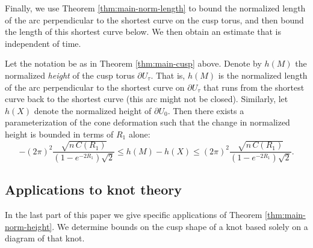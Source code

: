 Finally, we use Theorem \ref{thm:main-norm-length} to bound the
normalized length of the arc perpendicular to the shortest curve on
the cusp torus, and then bound the length of this shortest curve
below.  We then obtain an estimate that is independent of time.

\begin{theorem}
  Let the notation be as in Theorem \ref{thm:main-cusp} above.  Denote
  by $h(M)$ the normalized \emph{height} of the cusp torus $\partial
  U_\tau$.  That is, $h(M)$ is the normalized length of the arc
  perpendicular to the shortest curve on $\partial U_\tau$ that runs
  from the shortest curve back to the shortest curve (this arc might
  not be closed).  Similarly, let $h(X)$ denote the normalized height
  of $\partial U_0$.  Then
	there exists a parameterization of the cone deformation such that
	the change in normalized height is bounded in terms of $R_1$ alone:
$$-(2\pi)^2\frac{\sqrt{n\,C(R_1)}}{(1-e^{-2R_1})\sqrt{2}} \leq
 h(M) - h(X) \leq
(2\pi)^2\frac{\sqrt{n\,C(R_1)}}{(1-e^{-2R_1})\sqrt{2}}.$$
\label{thm:main-norm-height}
\end{theorem}




\subsection{Applications to knot theory}

In the last part of this paper we give specific applications of
Theorem \ref{thm:main-norm-height}.  We determine bounds on the cusp
shape of a knot based solely on a diagram of that knot.

